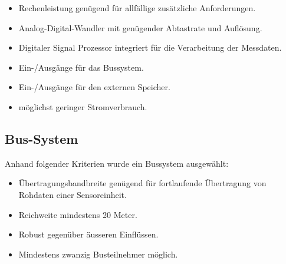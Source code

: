 \begin{itemize}
\item Rechenleistung genügend für allfällige zusätzliche Anforderungen.
\item Analog-Digital-Wandler mit genügender Abtastrate und Auflösung.
\item Digitaler Signal Prozessor integriert für die Verarbeitung der Messdaten.
\item Ein-/Ausgänge für das Bussystem.
\item Ein-/Ausgänge für den externen Speicher.
\item möglichst geringer Stromverbrauch.
\end{itemize}


\subsection{Bus-System}
Anhand folgender Kriterien wurde ein Bussystem ausgewählt:

\begin{itemize}
\item Übertragungsbandbreite genügend für fortlaufende Übertragung von Rohdaten einer Sensoreinheit.
\item Reichweite mindestens 20 Meter.
\item Robust gegenüber äusseren Einflüssen.
\item Mindestens zwanzig Busteilnehmer möglich.
\end{itemize}

